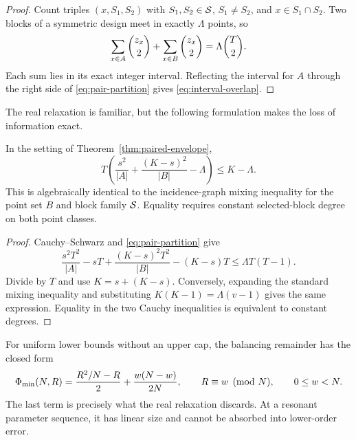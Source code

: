 \begin{proof}
Count triples \((x,S_1,S_2)\) with \(S_1,S_2\in\mathcal S\), \(S_1\ne S_2\), and
\(x\in S_1\cap S_2\).  Two blocks of a symmetric design meet in exactly
\(\Lambda\) points, so
\begin{equation}\label{eq:pair-partition}
 \sum_{x\in A}\binom{z_x}{2}
 +\sum_{x\in B}\binom{z_x}{2}
 =\Lambda\binom{T}{2}.
\end{equation}
Each sum lies in its exact integer interval.  Reflecting the interval for
\(A\) through the right side of \eqref{eq:pair-partition} gives
\eqref{eq:interval-overlap}.
\end{proof}

The real relaxation is familiar, but the following formulation makes the
loss of information exact.

\begin{corollary}
\label{cor:mixing-relaxation}
In the setting of Theorem~\ref{thm:paired-envelope},
\begin{equation}\label{eq:real-relaxation}
 T\left(\frac{s^2}{|A|}+\frac{(K-s)^2}{|B|}-\Lambda\right)
 \le K-\Lambda.
\end{equation}
This is algebraically identical to the incidence-graph mixing inequality for
the point set \(B\) and block family \(\mathcal S\).  Equality requires constant
selected-block degree on both point classes.
\end{corollary}

\begin{proof}
Cauchy--Schwarz and \eqref{eq:pair-partition} give
\[
 \frac{s^2T^2}{|A|}-sT
 +\frac{(K-s)^2T^2}{|B|}-(K-s)T
 \le \Lambda T(T-1).
\]
Divide by \(T\) and use \(K=s+(K-s)\).  Conversely, expanding the standard
mixing inequality and substituting
\(K(K-1)=\Lambda(v-1)\) gives the same expression.  Equality in the two
Cauchy inequalities is equivalent to constant degrees.
\end{proof}

For uniform lower bounds without an upper cap, the balancing remainder has the
closed form
\begin{equation}\label{eq:rounding-remainder}
 \Phi_{\min}(N,R)=\frac{R^2/N-R}{2}+\frac{w(N-w)}{2N},
 \qquad R\equiv w\pmod N,\qquad 0\le w<N.
\end{equation}
The last term is precisely what the real relaxation discards.  At a resonant
parameter sequence, it has linear size and cannot be absorbed into lower-order
error.
